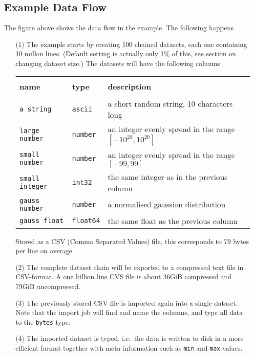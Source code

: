 \documentclass[a4paper]{article}
\begin{document}
\subsection*{Example Data Flow}
The figure above shows the data flow in the example.  The following happens
\begin{enumerate}
\item[(1)] The example starts by creating 100 chained datasets, each
  one containing 10 millon lines.  (Default setting is actually only
  1\% of this, see section on changing dataset size.)  The datasets
  will have the following columns
  \begin{snugshade}
  \noindent\begin{tabular}{@{}p{3.0cm}p{2cm}p{8.5cm}}\hline\\[-1ex]
  \textbf{name} & \textbf{type} & \textbf{description}\\[1ex]
  \hline\\[-0.5ex]
  \texttt{a string}      & \texttt{ascii}   & a short random string, 10 characters long\\
  \texttt{large number}  & \texttt{number}  & an integer evenly spread in the range $[-10^{20}, 10^{20}]$ \\
  \texttt{small number}  & \texttt{number}  & an integer evenly spread in the range $[-99, 99]$\\
  \texttt{small integer} & \texttt{int32}   & the same integer as in the previous column\\
  \texttt{gauss number}  & \texttt{number}  & a normalised gaussian distribution\\
  \texttt{gauss float}   & \texttt{float64} & the same float as the previous column\\[1ex]
  \hline
  \end{tabular}
  \end{snugshade}
  Stored as a CSV (Comma Separated Values) file, this corresponds to
  79 bytes per line on average.
    
  \item[(2)] The complete dataset chain will be exported to a
    compressed text file in CSV-format.  A one billion line CVS file
    is about 36GiB compressed and 79GiB uncompressed.
    
  \item[(3)] The previously stored CSV file is imported again into a
    single dataset.  Note that the import job will find and name the
    columns, and type all data to the \texttt{bytes} type.

  \item[(4)] The imported dataset is typed, i.e.\ the data is written
    to disk in a more efficient format together with meta information
    such as \texttt{min} and \texttt{max} values.
    

\end{enumerate}
\end{document}

